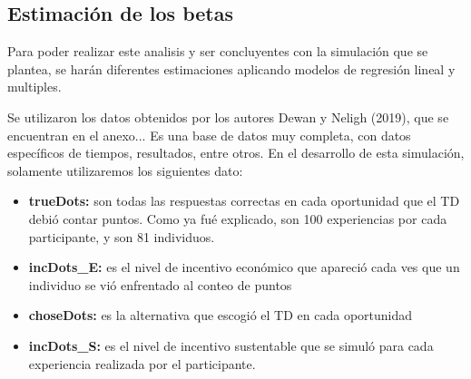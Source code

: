 \documentclass[11pt,letterpaper]{article}
\begin{document}
\subsection{Estimación de los betas}

Para poder realizar este analisis y ser concluyentes con la simulación que se plantea, se harán diferentes estimaciones aplicando modelos de regresión lineal y multiples. 

Se utilizaron los datos obtenidos por los autores Dewan y Neligh (2019), que se encuentran en el anexo... Es una base de datos muy completa, con datos específicos de tiempos, resultados, entre otros. En el desarrollo de esta simulación, solamente utilizaremos los siguientes dato:

\begin{itemize}
    \item \textbf{trueDots:} son todas las respuestas correctas en cada oportunidad que el TD debió contar puntos. Como ya fué explicado, son 100 experiencias por cada participante, y son 81 individuos.
    \item \textbf{incDots\_E:} es el nivel de incentivo económico que apareció cada ves que un individuo se vió enfrentado al conteo de puntos
    \item \textbf{choseDots:} es la alternativa que escogió el TD en cada oportunidad
    \item \textbf{incDots\_S:} es el nivel de incentivo sustentable que se simuló para cada experiencia realizada por el participante.
\end{itemize}
\end{document}
